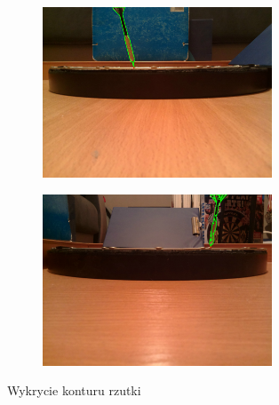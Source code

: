 \begin{figure}[h!]
\centering
\begin{subfigure}{\textwidth}
  \centering
  \includegraphics[width=0.75\textwidth]{obrazki/rzutka_pi0.jpg}
  \label{rzutka_pi0}
\end{subfigure}
\begin{subfigure}{\textwidth}
  \vspace{0.5cm}
  \centering
  \includegraphics[width=0.75\textwidth]{obrazki/rzutka_pi4.jpg}
  \label{rzutka_pi4}
\end{subfigure}
\caption{Wykrycie konturu rzutki}
\label{rzutka_kontury}
\end{figure}

